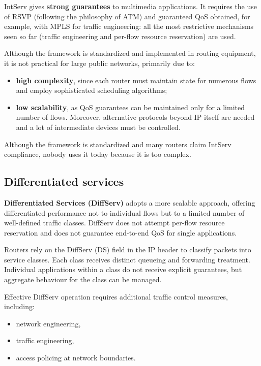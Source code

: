 IntServ gives \textbf{strong guarantees} to multimedia applications. It requires the use of RSVP (following the philosophy of ATM) and guaranteed QoS obtained, for example, with MPLS for traffic engineering: all the most restrictive mechanisms seen so far (traffic engineering and per-flow resource reservation) are used.

Although the framework is standardized and implemented in routing equipment, it is not practical for large public networks, primarily due to:

\begin{itemize}
\item \textbf{high complexity}, since each router must maintain state for numerous flows and employ sophisticated scheduling algorithms;
\item \textbf{low scalability}, as QoS guarantees can be maintained only for a limited number of flows. Moreover, alternative protocols beyond IP itself are needed and a lot of intermediate devices must be controlled.
\end{itemize}

Although the framework is standardized and many routers claim IntServ compliance, nobody uses it today because it is too complex.

\subsection{Differentiated services}

\textbf{Differentiated Services (DiffServ)} adopts a more scalable approach, offering differentiated performance not to individual flows but to a limited number of well-defined traffic classes. DiffServ does not attempt per-flow resource reservation and does not guarantee end-to-end QoS for single applications.

Routers rely on the DiffServ (DS) field in the IP header to classify packets into service classes. Each class receives distinct queueing and forwarding treatment. Individual applications within a class do not receive explicit guarantees, but aggregate behaviour for the class can be managed.

Effective DiffServ operation requires additional traffic control measures, including:

\begin{itemize}
\item network engineering,
\item traffic engineering,
\item access policing at network boundaries.
\end{itemize}

